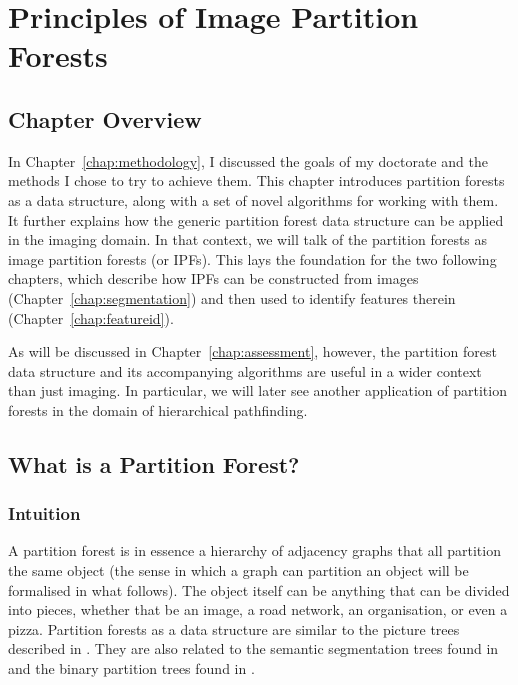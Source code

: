 \chapter{Principles of Image Partition Forests}
\label{chap:ipfs}

\section{Chapter Overview}

In Chapter~\ref{chap:methodology}, I discussed the goals of my doctorate and the methods I chose to try to achieve them. This chapter introduces partition forests as a data structure, along with a set of novel algorithms for working with them. It further explains how the generic partition forest data structure can be applied in the imaging domain. In that context, we will talk of the partition forests as image partition forests (or IPFs). This lays the foundation for the two following chapters, which describe how IPFs can be constructed from images (Chapter~\ref{chap:segmentation}) and then used to identify features therein (Chapter~\ref{chap:featureid}).

As will be discussed in Chapter~\ref{chap:assessment}, however, the partition forest data structure and its accompanying algorithms are useful in a wider context than just imaging. In particular, we will later see another application of partition forests in the domain of hierarchical pathfinding.

\section{What is a Partition Forest?}

\subsection{Intuition}

A partition forest is in essence a hierarchy of adjacency graphs that all partition the same object (the sense in which a graph can partition an object will be formalised in what follows). The object itself can be anything that can be divided into pieces, whether that be an image, a road network, an organisation, or even a pizza. Partition forests as a data structure are similar to the picture trees described in \cite{andrade03}. They are also related to the semantic segmentation trees found in \cite{al-haj08} and the binary partition trees found in \cite{salembier00}.

